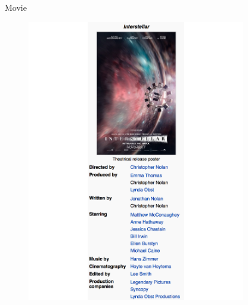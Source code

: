 \documentclass{beamer}
\begin{document}
\begin{frame}{Movie}
\begin{figure}
\begin{columns}[c]
			\centering\includegraphics[width=0.85\textwidth]{introduction/interstellar_info.pdf}
		\end{columns}
	\end{figure}
\end{frame}
\end{document}
